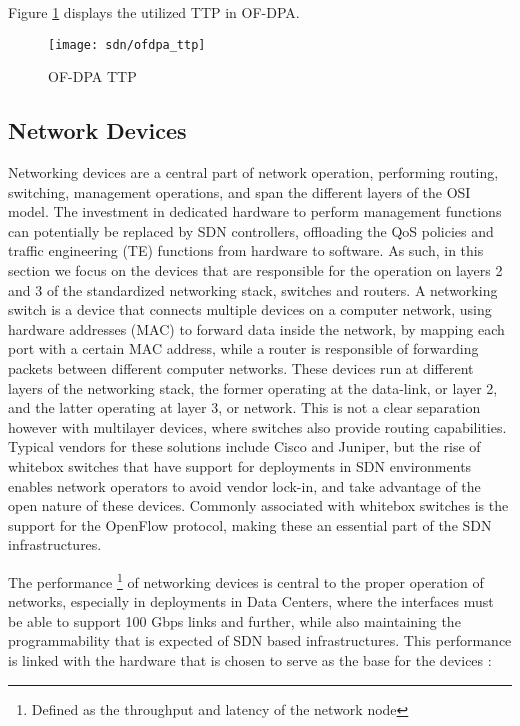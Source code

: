 \begin {enumerate}
\par Figure \ref{fig:ofdpa_tables} displays the utilized TTP in OF-DPA.

\begin{figure}[H]
    \centering
    \texttt{[image: sdn/ofdpa\_ttp]}
    \caption{OF-DPA TTP \cite{broadcom_corporation_openflow_2017}}
    \label{fig:ofdpa_tables}
\end{figure}

\subsection {Network Devices}

Networking devices are a central part of network operation, performing routing, switching, management operations, and span the different layers of the OSI model. 
The investment in dedicated hardware to perform management functions can potentially be replaced by SDN controllers, offloading the QoS policies and traffic
engineering (TE) functions from hardware to software. As such, in this section we focus on the devices that are responsible for the operation on layers 2 and 3 of
the standardized networking stack, switches and routers. A networking switch is a device that connects multiple devices on a computer network, using hardware
addresses (MAC) to forward data inside the network, by mapping each port with a certain MAC address, while a router is responsible of forwarding packets between
different computer networks. These devices run at different layers of the networking stack, the former operating at the data-link, or layer 2, and the latter
operating at layer 3, or network. This is not a clear separation however with multilayer devices, where switches also provide routing capabilities. Typical vendors
for these solutions include Cisco and Juniper, but the rise of whitebox switches that have support for deployments in SDN environments enables network operators to
avoid vendor lock-in, and take advantage of the open nature of these devices. Commonly associated with whitebox switches is the support for the OpenFlow protocol,
making these an essential part of the SDN infrastructures.

\par The performance \footnote {Defined as the throughput and latency of the network node} of networking devices is central to the proper operation of networks,
especially in deployments in Data Centers, where the interfaces must be able to support 100 Gbps links and further, while also maintaining the programmability that
is expected of SDN based infrastructures. This performance is linked with the hardware that is chosen to serve as the base for the devices \cite{sezer_are_2013}:


\end{enumerate}
